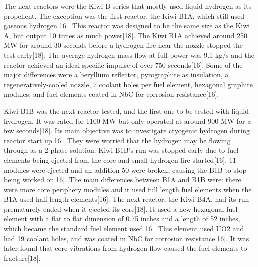 \documentclass{article}
\begin{document}
    The next reactors were the Kiwi-B series that mostly used liquid hydrogen as its propellent. The exception was the first reactor, the Kiwi B1A, which still used gaseous hydrogen[16]. This reactor was designed to be the same size as the Kiwi A, but output 10 times as much power[18]. The Kiwi B1A achieved around 250 MW for around 30 seconds before a hydrogen fire near the nozzle stopped the test early[18]. The average hydrogen mass flow at full power was 9.1 kg/s and the reactor achieved an ideal specific impulse of over 750 seconds[16]. Some of the major differences were a beryllium reflector, pyrographite as insulation, a regeneratively-cooled nozzle, 7 coolant holes per fuel element, hexagonal graphite modules, and fuel elements coated in NbC for corrosion resistance[16]. 


    Kiwi B1B was the next reactor tested, and the first one to be tested with liquid hydrogen. It was rated for 1100 MW but only operated at around 900 MW for a few seconds[18]. Its main objective was to investigate cryogenic hydrogen during reactor start up[16]. They were worried that the hydrogen may be flowing through as a 2-phase solution. Kiwi B1B's run was stopped early due to fuel elements being ejected from the core and small hydrogen fire started[16]. 11 modules were ejected and an addition 50 were broken, causing the B1B to stop being worked on[16]. The main differences between B1A and B1B were: there were more core periphery modules and it used full length fuel elements when the B1A used half-length elements[16]. 
The next reactor, the Kiwi B4A, had its run prematurely ended when it ejected its core[18]. It used a new hexagonal fuel element with a flat to flat dimension of 0.75 inches and a length of 52 inches, which became the standard fuel element used[16]. This element used UO2 and had 19 coolant holes, and was coated in NbC for corrosion resistance[16]. It was later found that core vibrations from hydrogen flow caused the fuel elements to fracture[18]. 
\end{document}
